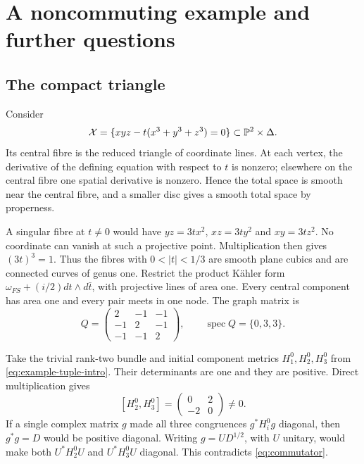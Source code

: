 \section{A noncommuting example and further questions}\label{sec:example}

\subsection{The compact triangle}
Consider
\begin{equation}\label{eq:cubic-family}
 \mathcal X=\{xyz-t(x^3+y^3+z^3)=0\}\subset\mathbb P^2\times\Delta.
\end{equation}
Its central fibre is the reduced triangle of coordinate lines. At
each vertex, the derivative of the defining equation with respect
to $t$ is nonzero; elsewhere on the central fibre one spatial
derivative is nonzero. Hence the total space is smooth near the
central fibre, and a smaller disc gives a smooth total space by
properness.

A singular fibre at $t\ne0$ would have
$yz=3tx^2$, $xz=3ty^2$ and $xy=3tz^2$. No coordinate can vanish
at such a projective point. Multiplication then gives $(3t)^3=1$.
Thus the fibres with $0<|t|<1/3$ are smooth plane cubics and are
connected curves of genus one. Restrict the product K\"ahler form
$\omega_{FS}+(i/2)dt\wedge d\bar t$, with projective lines of
area one. Every central component has area one and every pair
meets in one node. The graph matrix is
\begin{equation}\label{eq:triangle-matrix}
 Q=\begin{pmatrix}2&-1&-1\\-1&2&-1\\-1&-1&2\end{pmatrix},
 \qquad\operatorname{spec}Q=\{0,3,3\}.
\end{equation}

Take the trivial rank-two bundle and initial component metrics
$H_1^0,H_2^0,H_3^0$ from \eqref{eq:example-tuple-intro}. Their
determinants are one and they are positive. Direct multiplication gives
\begin{equation}\label{eq:commutator}
 [H_2^0,H_3^0]=\begin{pmatrix}0&2\\-2&0\end{pmatrix}\ne0.
\end{equation}
If a single complex matrix $g$ made all three congruences
$g^*H_i^0g$ diagonal, then $g^*g=D$ would be positive diagonal.
Writing $g=UD^{1/2}$, with $U$ unitary, would make both
$U^*H_2^0U$ and $U^*H_3^0U$ diagonal. This contradicts
\eqref{eq:commutator}.

